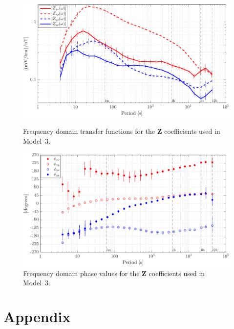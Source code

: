 \documentclass[draft,linenumbers]{agujournal2018}
\begin{document}
\begin{figure}[h]
  \centering
  \includegraphics[width=\textwidth]{figures/plot_model_summary_Z_MT-options-1.pdf}
  \caption{Frequency domain transfer functions for the $\mathbf{Z}$ coefficients used in Model~3.}
  \label{Z_MT}

  \vspace{4em}

  \centering
  \includegraphics[width=\textwidth]{figures/plot_model_summary_Phi_MT-options-1.pdf}
  \caption{Frequency domain phase values for the $\mathbf{Z}$ coefficients used in Model~3.}
  \label{Phi_MT}
\end{figure}

\clearpage

\section{Appendix}

\setcounter{table}{0}
\renewcommand{\thetable}{A\arabic{table}}
\end{document}
